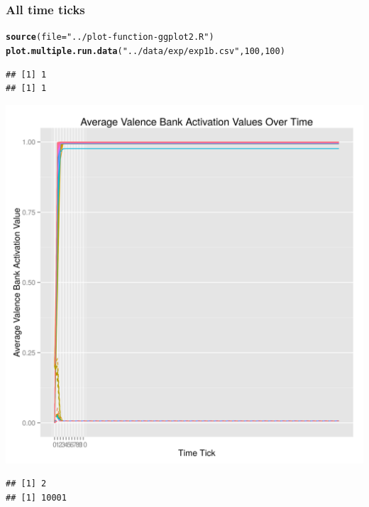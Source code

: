 \documentclass{article}\usepackage[]{graphicx}\usepackage[]{color}
\makeatletter
\def\maxwidth{ %
  \ifdim\Gin@nat@width>\linewidth
    \linewidth
  \else
    \Gin@nat@width
  \fi
}
\newcommand{\hlnum}[1]{\textcolor[rgb]{0.686,0.059,0.569}{#1}}%
\newcommand{\hlstr}[1]{\textcolor[rgb]{0.192,0.494,0.8}{#1}}%
\newcommand{\hlstd}[1]{\textcolor[rgb]{0.345,0.345,0.345}{#1}}%
\newcommand{\hlkwc}[1]{\textcolor[rgb]{0.333,0.667,0.333}{#1}}%
\newcommand{\hlkwd}[1]{\textcolor[rgb]{0.737,0.353,0.396}{\textbf{#1}}}%
\newenvironment{kframe}{%
 \def\at@end@of@kframe{}%
 \ifinner\ifhmode%
  \def\at@end@of@kframe{\end{minipage}}%
  \begin{minipage}{\columnwidth}%
 \fi\fi%
 \def\FrameCommand##1{\hskip\@totalleftmargin \hskip-\fboxsep
 \colorbox{shadecolor}{##1}\hskip-\fboxsep
     \hskip-\linewidth \hskip-\@totalleftmargin \hskip\columnwidth}%
 \MakeFramed {\advance\hsize-\width
   \@totalleftmargin\z@ \linewidth\hsize
   \@setminipage}}%
 {\par\unskip\endMakeFramed%
 \at@end@of@kframe}
\newenvironment{knitrout}{}{} %
\makeatother
\begin{document}
\newpage
\subsubsection{All time ticks}
\begin{knitrout}
\color{fgcolor}\begin{kframe}
\begin{alltt}
\hlkwd{source}\hlstd{(}\hlkwc{file} \hlstd{=} \hlstr{"../plot-function-ggplot2.R"}\hlstd{)}
\hlkwd{plot.multiple.run.data}\hlstd{(}\hlstr{"../data/exp/exp1b.csv"}\hlstd{,} \hlnum{100}\hlstd{,} \hlnum{100}\hlstd{)}
\end{alltt}
\begin{verbatim}
## [1] 1
## [1] 1
\end{verbatim}
\end{kframe}
\includegraphics[width=\maxwidth]{figure/unnamed-chunk-21} 
\begin{kframe}\begin{verbatim}
## [1] 2
## [1] 10001
\end{verbatim}
\end{kframe}

\end{knitrout}
\end{document}
